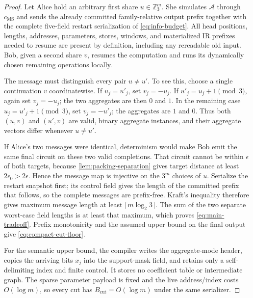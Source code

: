 \documentclass[a4paper,twocolumn,10pt,unpublished]{quantumarticle}
\begin{document}
\begin{proof}
Let Alice hold an arbitrary first share $u\in\mathbb Z_3^m$.  She simulates
$\mathcal A$ through $c_{\mathrm{MS}}$ and sends the already committed
family-relative output prefix together with the complete five-field restart
serialization of \eqref{eq:info-budget}.  All head positions, lengths,
addresses, parameters, stores, windows, and materialized IR prefixes needed
to resume are present by definition, including any rereadable old input.
Bob, given a second share $v$, resumes the computation and runs its
dynamically chosen remaining operations locally.

The message must distinguish every pair $u\neq u'$.  To see this, choose a
single continuation $v$ coordinatewise.  If $u_j=u'_j$, set
$v_j=-u_j$.  If $u'_j=u_j+1\pmod3$, again set $v_j=-u_j$; the two aggregates
are then $0$ and $1$.  In the remaining case
$u_j=u'_j+1\pmod3$, set $v_j=-u'_j$; the aggregates are $1$ and $0$.
Thus both $(u,v)$ and $(u',v)$ are valid, binary aggregate instances, and
their aggregate vectors differ whenever $u\neq u'$.

If Alice's two messages were identical, determinism would make Bob emit the
same final circuit on these two valid completions.  That circuit cannot be
within $\epsilon$ of both targets, because
\cref{lem:packing-separation} gives target distance at least
$2\epsilon_0>2\epsilon$.  Hence the message map is injective on the
$3^m$ choices of $u$.  Serialize the restart snapshot first; its control
field gives the length of the committed prefix that follows, so the complete
messages are prefix-free.  Kraft's inequality therefore gives maximum
message length at least $\lceil m\log_2 3\rceil$.  The sum of the two
separate worst-case field lengths is at least that maximum, which proves
\eqref{eq:main-tradeoff}.  Prefix monotonicity and the assumed
upper bound on the final output give \eqref{eq:compact-cut-floor}.

For the semantic upper bound, the compiler writes the aggregate-mode header,
copies the arriving bits $x_j$ into the support-mask field, and retains only
a self-delimiting index and finite control.  It stores no coefficient table
or intermediate graph.  The sparse parameter payload is fixed and the live
address/index costs $O(\log m)$, so every cut has
$B_{\mathrm{cut}}=O(\log m)$ under the same serializer.


\end{proof}
\end{document}
